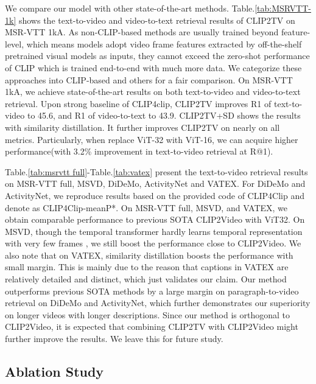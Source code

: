 We compare our model with other state-of-the-art methods. Table.\ref{tab:MSRVTT-1k} shows the text-to-video and video-to-text retrieval results of CLIP2TV on MSR-VTT 1kA.
As non-CLIP-based methods are usually trained beyond feature-level, which means models adopt video frame features extracted by off-the-shelf pretrained visual models as inputs, they cannot exceed the zero-shot performance of CLIP which is trained end-to-end with much more data.
We categorize these approaches into CLIP-based and others for a fair comparison.
On MSR-VTT 1kA, we achieve state-of-the-art results on both text-to-video and video-to-text retrieval.
Upon strong baseline of CLIP4clip, CLIP2TV improves R1 of text-to-video to 45.6, and R1 of video-to-text to 43.9.
CLIP2TV+SD shows the results with similarity distillation. It further improves CLIP2TV on nearly on all metrics.
Particularly, when replace ViT-32 with ViT-16, we can acquire higher performance(with 3.2\% improvement in text-to-video retrieval at R@1).

Table.\ref{tab:msrvtt full}-Table.\ref{tab:vatex} present the text-to-video retrieval results on MSR-VTT full, MSVD, DiDeMo, ActivityNet and VATEX. For DiDeMo and ActivityNet, we reproduce results based on the provided code of CLIP4Clip and denote as CLIP4Clip-meanP*. On MSR-VTT full, MSVD, and VATEX, we obtain comparable performance to previous SOTA CLIP2Video with ViT32.
On MSVD, though the temporal transformer hardly learns temporal representation with very few frames \cite{luo2021clip4clip,fang2021clip2video}, we still boost the performance close to CLIP2Video.
We also note that on VATEX, similarity distillation boosts the performance with small margin. This is mainly due to the reason that captions in VATEX are relatively detailed and distinct, which just validates our claim.
Our method outperforms previous SOTA methods by a large margin on paragraph-to-video retrieval on DiDeMo and ActivityNet, which further demonstrates our superiority on longer videos with longer descriptions.
Since our method is orthogonal to CLIP2Video, it is expected that combining CLIP2TV with CLIP2Video might further improve the results. We leave this for future study.

\subsection{Ablation Study}

